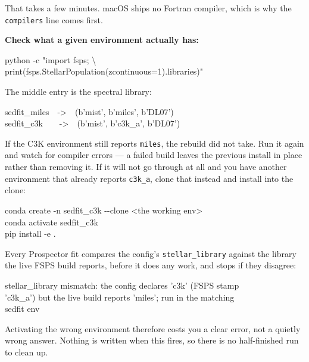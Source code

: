 \documentclass[11pt]{article}
\begin{document}
That takes a few minutes. macOS ships no Fortran compiler, which is why
the \texttt{compilers} line comes first.

\textbf{Check what a given environment actually has:}

\begin{cmd}\ttfamily
python -c "import fsps; \textbackslash\\
\hspace*{2em}print(fsps.StellarPopulation(zcontinuous=1).libraries)"
\end{cmd}

The middle entry is the spectral library:

\begin{cmd}\ttfamily
sedfit\_miles~~->~~(b'mist', b'miles', b'DL07')\\
sedfit\_c3k~~~~->~~(b'mist', b'c3k\_a', b'DL07')
\end{cmd}

If the C3K environment still reports \texttt{miles}, the rebuild did not
take. Run it again and watch for compiler errors --- a failed build
leaves the previous install in place rather than removing it. If it will
not go through at all and you have another environment that already
reports \texttt{c3k\_a}, clone that instead and install into the clone:

\begin{cmd}\ttfamily
conda create -n sedfit\_c3k -{}-clone <the working env>\\
conda activate sedfit\_c3k\\
pip install -e .
\end{cmd}

\begin{notebox}
Every Prospector fit compares the config's \texttt{stellar\_library}
against the library the live FSPS build reports, before it does any
work, and stops if they disagree:

\smallskip
\begin{cmd}\ttfamily\small
stellar\_library mismatch: the config declares 'c3k' (FSPS stamp\\
'c3k\_a') but the live build reports 'miles'; run in the matching\\
sedfit env
\end{cmd}
\smallskip

Activating the wrong environment therefore costs you a clear error, not
a quietly wrong answer. Nothing is written when this fires, so there is
no half-finished run to clean up.
\end{notebox}
\end{document}
